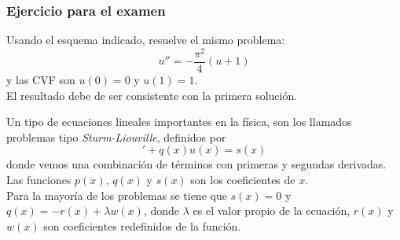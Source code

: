\begin{frame}
\frametitle{Ejercicio para el examen}
Usando el esquema indicado, resuelve el mismo problema:
\begin{equation}
u'' = - \dfrac{\pi^{2}}{4}(u+1)
\end{equation}
y las CVF son $u(0)=0$ y $u(1)=1$. 
\\
\bigskip
El resultado debe de ser consistente con la primera solución.
\end{frame}
\begin{frame}
Un tipo de ecuaciones lineales importantes en la física, son los llamados problemas tipo \emph{Sturm-Liouville}, definidos por
\begin{equation}
[p(x) u'(x)]' + q(x) u(x) = s(x)
\end{equation}
donde vemos una combinación de términos con primeras y segundas derivadas. Las funciones $p(x)$, $q(x)$ y $s(x)$ son los coeficientes de $x$.
\\
\medskip
Para la mayoría de los problemas se tiene que $s(x)=0$ y $q(x) = - r(x) +  \lambda w(x)$, donde $\lambda$ es el valor propio de la ecuación, $r(x)$ y $w(x)$ son coeficientes redefinidos de la función.
\end{frame}
